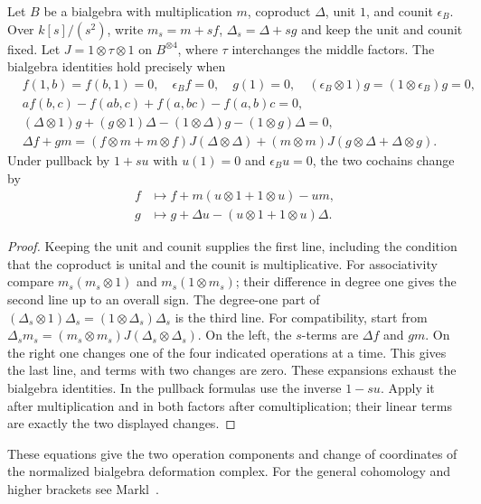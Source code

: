 \begin{proposition}
\label{res:LD07}
Let \(B\) be a bialgebra with multiplication \(m\), coproduct \(\Delta\),
unit \(1\), and counit \(\epsilon_B\).
Over \(k[s]/(s^2)\), write \(m_s=m+sf\), \(\Delta_s=\Delta+sg\)
and keep the unit and counit fixed. Let
\(J=1\otimes\tau\otimes1\) on \(B^{\otimes4}\), where
\(\tau\) interchanges the middle factors.
The bialgebra identities hold precisely when
\[
 \begin{aligned}
 &f(1,b)=f(b,1)=0,\quad \epsilon_B f=0,\quad
   g(1)=0,\quad (\epsilon_B\otimes1)g=(1\otimes\epsilon_B)g=0,\\
 &a f(b,c)-f(ab,c)+f(a,bc)-f(a,b)c=0,\\
 &(\Delta\otimes1)g+(g\otimes1)\Delta
        -(1\otimes\Delta)g-(1\otimes g)\Delta=0,\\
 &\Delta f+gm=(f\otimes m+m\otimes f)J(\Delta\otimes\Delta)
             +(m\otimes m)J(g\otimes\Delta+\Delta\otimes g).
 \end{aligned}
\]
Under pullback by \(1+s u\) with \(u(1)=0\) and
\(\epsilon_B u=0\), the two cochains change by
\[
 \begin{aligned}
 f&\longmapsto f+m(u\otimes1+1\otimes u)-u m,\\
 g&\longmapsto g+\Delta u-(u\otimes1+1\otimes u)\Delta.
 \end{aligned}
\]
\end{proposition}
\begin{proof}
Keeping the unit and counit supplies the first line, including
the condition that the coproduct is unital and the counit is
multiplicative. For associativity compare
\(m_s(m_s\otimes1)\) and \(m_s(1\otimes m_s)\);
their difference in degree one gives the second line up to
an overall sign. The degree-one part of
\((\Delta_s\otimes1)\Delta_s=(1\otimes\Delta_s)\Delta_s\)
is the third line. For compatibility, start from
\(\Delta_s m_s=(m_s\otimes m_s)J(\Delta_s\otimes\Delta_s)\).
On the left, the \(s\)-terms are \(\Delta f\) and \(gm\).
On the right one changes one of the four indicated operations
at a time. This gives the last line, and terms with two changes
are zero. These expansions exhaust the bialgebra identities.
In the pullback formulas use the inverse \(1-su\). Apply it
after multiplication and in both factors after comultiplication;
their linear terms are exactly the two displayed changes.
\end{proof}

These equations give the two operation components and change of
coordinates of the normalized bialgebra deformation complex.
For the general cohomology and higher brackets see
Markl~\cite[Section 6]{markl}.

